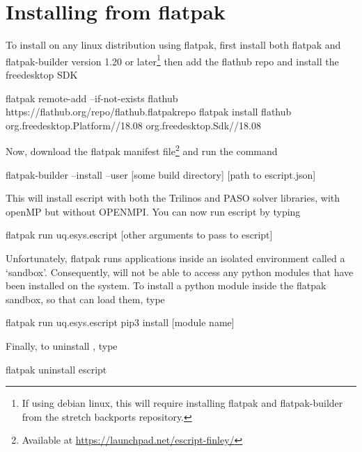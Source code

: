 %
%
%


\chapter{Installing from flatpak}\label{chap:flatpak}

To install \escript on any linux distribution using flatpak, first install both flatpak and flatpak-builder version 1.20 or later\footnote{If using debian linux, this will require installing flatpak and flatpak-builder from the stretch backports repository.} then add the flathub repo and install the freedesktop SDK

\begin{smallShellCode}
flatpak remote-add --if-not-exists flathub https://flathub.org/repo/flathub.flatpakrepo
flatpak install flathub org.freedesktop.Platform//18.08 org.freedesktop.Sdk//18.08
\end{smallShellCode}

Now, download the flatpak manifest file\footnote{Available at \url{https://launchpad.net/escript-finley/}} and run the command

\begin{smallShellCode}
flatpak-builder --install --user [some build directory] [path to escript.json]
\end{smallShellCode}

This will install escript with both the Trilinos and PASO solver libraries, with openMP but without OPENMPI. You can now run escript by typing

\begin{smallShellCode}
flatpak run uq.esys.escript [other arguments to pass to escript]
\end{smallShellCode}

Unfortunately, flatpak runs applications inside an isolated environment called a `sandbox'. Consequently, \escript will not be able to access any python modules that have been installed on the system. To install a python module inside the flatpak sandbox, so that \escript can load them, type

\begin{smallShellCode}
flatpak run uq.esys.escript pip3 install [module name]
\end{smallShellCode}

Finally, to uninstall \escript, type

\begin{smallShellCode}
flatpak uninstall escript
\end{smallShellCode}
